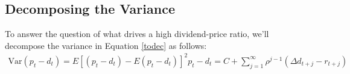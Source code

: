 \documentclass[a4paper,12pt]{scrartcl}
\begin{document}
\newpage
\subsection{Decomposing the Variance}

To answer the question of what drives a high dividend-price ratio,
we'll decompose the variance in Equation \ref{todec} as follows:
\begin{align*}
    \text{Var}(p_t - d_t) = E\left[ (p_t - d_t) - E(p_t - d_t) \right]^2
    p_t - d_t = C +  \sum^\infty_{j=1} \rho^{j-1} (\Delta d_{t+j}
	- r_{t+j})
\end{align*}







%
\end{document}
